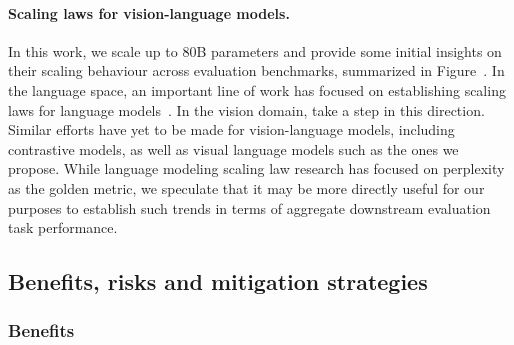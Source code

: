 \paragraph{Scaling laws for vision-language models.}
In this work, we scale \methodfamily{} up to 80B parameters and provide some initial insights on their scaling behaviour across evaluation benchmarks, summarized in Figure~.
In the language space, an important line of work has focused on establishing scaling laws for language models~\citep{kaplan2020scaling,chinchilla}.
In the vision domain, \citet{jft3b} take a step in this direction.
Similar efforts have yet to be made for vision-language models, including contrastive models, as well as visual language models such as the ones we propose.
While language modeling scaling law research has focused on perplexity as the golden metric, we speculate that it may be more directly useful for our purposes
to establish such trends in terms of aggregate downstream evaluation task performance.

\subsection{Benefits, risks and mitigation strategies}
\label{sec:broader_impact}

\subsubsection{Benefits}


